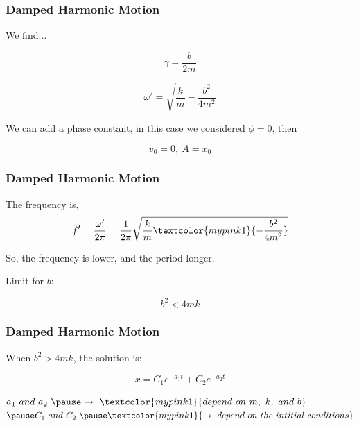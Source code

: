 \documentclass[]{beamer}
\begin{document}
\begin{frame}
\frametitle{Damped Harmonic Motion}

We find...

\begin{equation}
\gamma=\frac{b}{2m}
\end{equation}

\begin{equation}
\omega'=\sqrt{\frac{k}{m}-\frac{b^2}{4m^2}}
\end{equation}

\pause

We can add a phase constant, in this case we considered $\phi=0$, then 

\begin{equation*}
v_0=0,~A=x_0
\end{equation*}

\end{frame}

\begin{frame}
\frametitle{Damped Harmonic Motion}

The frequency is,
\pause
\begin{equation}
f'=\frac{\omega'}{2\pi}=\frac{1}{2\pi}\sqrt{\frac{k}{m}\textcolor{mypink1}{-\frac{b^2}{4m^2}}}
\end{equation}
\pause

\vspace{3mm}

\pause
So, the frequency is lower, and the period longer.
\vspace{3mm}

\pause
Limit for $b$:
\pause

\begin{equation}
b^2<4mk
\end{equation}

\end{frame}

\begin{frame}
  \frametitle{Damped Harmonic Motion}
  
When $b^2>4mk$, the solution is:
\vspace{3mm}

\begin{equation}
  x=C_1 e^{-a_1 t}+C_2 e^{-a_2 t}
\end{equation}
\vspace{3mm}

\pause

$a_1~ and~ a_2 ~\pause \rightarrow~ \textcolor{mypink1}{depend~ on~ m,~ k,~ and~ b}$
\\
\vspace{3mm}
$\pause C_1~ and~ C_2 ~\pause \textcolor{mypink1}{\rightarrow~ depend~ on~the~ intitial~ conditions}$

  \end{frame}
  
\end{document}
